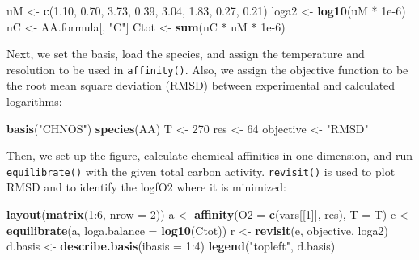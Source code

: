 \documentclass[]{tufte-handout}
\newenvironment{Shaded}{}{}
\newcommand{\KeywordTok}[1]{\textcolor[rgb]{0.00,0.44,0.13}{\textbf{#1}}}
\newcommand{\DataTypeTok}[1]{\textcolor[rgb]{0.56,0.13,0.00}{#1}}
\newcommand{\DecValTok}[1]{\textcolor[rgb]{0.25,0.63,0.44}{#1}}
\newcommand{\FloatTok}[1]{\textcolor[rgb]{0.25,0.63,0.44}{#1}}
\newcommand{\StringTok}[1]{\textcolor[rgb]{0.25,0.44,0.63}{#1}}
\newcommand{\OperatorTok}[1]{\textcolor[rgb]{0.40,0.40,0.40}{#1}}
\newcommand{\NormalTok}[1]{#1}
\begin{document}
\begin{Shaded}
\begin{Highlighting}[]
\NormalTok{uM <-}\StringTok{ }\KeywordTok{c}\NormalTok{(}\FloatTok{1.10}\NormalTok{, }\FloatTok{0.70}\NormalTok{, }\FloatTok{3.73}\NormalTok{, }\FloatTok{0.39}\NormalTok{, }\FloatTok{3.04}\NormalTok{, }\FloatTok{1.83}\NormalTok{, }\FloatTok{0.27}\NormalTok{, }\FloatTok{0.21}\NormalTok{)}
\NormalTok{loga2 <-}\StringTok{ }\KeywordTok{log10}\NormalTok{(uM }\OperatorTok{*}\StringTok{ }\FloatTok{1e-6}\NormalTok{)}
\NormalTok{nC <-}\StringTok{ }\NormalTok{AA.formula[, }\StringTok{"C"}\NormalTok{]}
\NormalTok{Ctot <-}\StringTok{ }\KeywordTok{sum}\NormalTok{(nC }\OperatorTok{*}\StringTok{ }\NormalTok{uM }\OperatorTok{*}\StringTok{ }\FloatTok{1e-6}\NormalTok{)}
\end{Highlighting}
\end{Shaded}

Next, we set the basis, load the species, and assign the temperature and
resolution to be used in {\texttt{affinity()}}. Also, we assign the
objective function to be the root mean square deviation (RMSD) between
experimental and calculated logarithms:

\begin{Shaded}
\begin{Highlighting}[]
\KeywordTok{basis}\NormalTok{(}\StringTok{"CHNOS"}\NormalTok{)}
\KeywordTok{species}\NormalTok{(AA)}
\NormalTok{T <-}\StringTok{ }\DecValTok{270}
\NormalTok{res <-}\StringTok{ }\DecValTok{64}
\NormalTok{objective <-}\StringTok{ "RMSD"}
\end{Highlighting}
\end{Shaded}

Then, we set up the figure, calculate chemical affinities in one
dimension, and run {\texttt{equilibrate()}} with the given total carbon
activity. {\texttt{revisit()}} is used to plot RMSD and to identify the
logfO2 where it is minimized:

\begin{Shaded}
\begin{Highlighting}[]
\KeywordTok{layout}\NormalTok{(}\KeywordTok{matrix}\NormalTok{(}\DecValTok{1}\OperatorTok{:}\DecValTok{6}\NormalTok{, }\DataTypeTok{nrow =} \DecValTok{2}\NormalTok{))}
\NormalTok{a <-}\StringTok{ }\KeywordTok{affinity}\NormalTok{(}\DataTypeTok{O2 =} \KeywordTok{c}\NormalTok{(vars[[}\DecValTok{1}\NormalTok{]], res), }\DataTypeTok{T =}\NormalTok{ T)}
\NormalTok{e <-}\StringTok{ }\KeywordTok{equilibrate}\NormalTok{(a, }\DataTypeTok{loga.balance =} \KeywordTok{log10}\NormalTok{(Ctot))}
\NormalTok{r <-}\StringTok{ }\KeywordTok{revisit}\NormalTok{(e, objective, loga2)}
\NormalTok{d.basis <-}\StringTok{ }\KeywordTok{describe.basis}\NormalTok{(}\DataTypeTok{ibasis =} \DecValTok{1}\OperatorTok{:}\DecValTok{4}\NormalTok{)}
\KeywordTok{legend}\NormalTok{(}\StringTok{"topleft"}\NormalTok{, d.basis)}
\end{Highlighting}
\end{Shaded}
\end{document}
